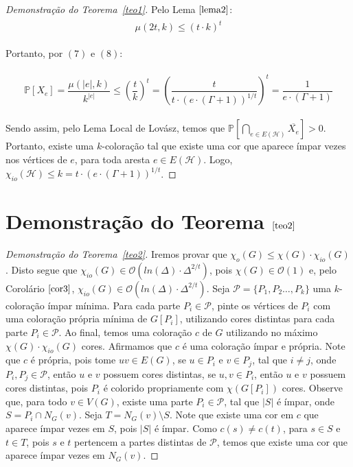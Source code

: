 \documentclass[12pt]{article}
\begin{document}
{\begin{proof}[Demonstração do Teorema~\ref{teo1}]
	Pelo Lema $\ref{lema2}$:
 	\begin{align}
 		\begin{split}
 			\mu(2t, k) \leq (t {\cdot } k)^t
 		\end{split} 
 	\end{align} 
  
    Portanto, por $(7)$ e $(8)$:
    
	\begin{align}
		\begin{split}
			\mathds{P}[X_{e}] = \dfrac{\mu(|e|, k)}{k^{|e|}} 
			 \leq \left(\dfrac{t}{k}\right)^t  = \left(\dfrac{t}{t {\cdot}   (e {\cdot} (\Gamma + 1))^{1/t}}\right)^t = \dfrac{1}{e {\cdot} (\Gamma + 1)}
		\end{split} 
	\end{align}
	
  Sendo assim, pelo Lema Local de Lovász, temos que $\mathds{P}[\bigcap\limits_{e \in E(\mathcal{H})} \overline{X_{e}} ] > 0$. Portanto, existe uma $k$-coloração tal que existe uma cor que aparece ímpar vezes nos vértices de $e$, para toda aresta $e \in E(\mathcal{H})$. Logo, $\chi_{io}(\mathcal{H}) \leq k = t {\cdot} (e {\cdot} (\Gamma + 1))^{1/t}$.
	
\end{proof}\newbegin
 
  \section{Demonstração do Teorema $\ref{teo2}$} \newl
  
 \begin{proof}[Demonstração do Teorema~\ref{teo2}]
 	Iremos provar que $\chi_{o}(G) \leq \chi(G) {\cdot} \chi_{io}(G)$. Disto segue que $\chi_{io}(G) \in \mathcal{O}(ln(\Delta) {\cdot} \Delta^{2/t})$, pois $\chi(G) \in \mathcal{O}(1)$ e, pelo Corolário $\ref{cor3}$, $\chi_{io}(G) \in \mathcal{O}(ln(\Delta) {\cdot} \Delta^{2/t})$. Seja $\mathcal{P} = \{P_1, P_2 \ldots, P_k\}$ uma $k$-coloração ímpar mínima. Para cada parte $P_i \in \mathcal{P}$, pinte os vértices de $P_i$ com uma coloração própria mínima de $G[P_i]$, utilizando cores distintas para cada parte $P_i \in \mathcal{P}$. Ao final, temos uma coloração $c$ de $G$ utilizando no máximo $\chi(G) {\cdot} \chi_{io}(G)$ cores. Afirmamos que $c$ é uma coloração ímpar e própria. Note que $c$ é própria, pois tome $uv \in E(G)$, se $u \in P_i$ e $v \in P_j$, tal que $i \neq j$, onde $P_i, P_j \in \mathcal{P}$, então $u$ e $v$ possuem cores distintas, se $u, v \in P_i$, então $u$ e $v$ possuem cores distintas, pois $P_i$ é colorido propriamente com $\chi(G[P_i])$ cores. Observe que, para todo $v \in V(G)$, existe uma parte $P_i \in \mathcal{P}$, tal que $|S|$ é ímpar, onde $S = P_i \cap N_G(v)$. Seja $T = N_G(v) \setminus S$. Note que existe uma cor em $c$ que aparece ímpar vezes em $S$, pois $|S|$ é ímpar. Como $c(s) \neq c(t)$, para $s \in S$ e $t \in T$, pois $s$ e $t$ pertencem a partes distintas de $\mathcal{P}$, temos que existe uma cor que aparece ímpar vezes em $N_G(v)$. 
 	

\end{proof}}
\end{document}
